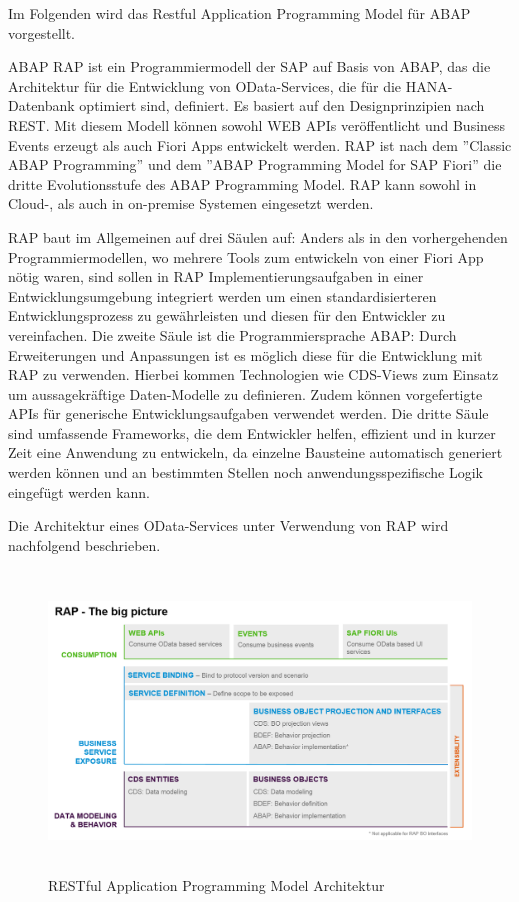 Im Folgenden wird das Restful Application Programming Model für ABAP vorgestellt.

ABAP RAP ist ein Programmiermodell der SAP auf Basis von ABAP, das die Architektur für die Entwicklung von OData-Services, die für die HANA-Datenbank optimiert sind, definiert. Es basiert auf den Designprinzipien nach REST. Mit diesem Modell können sowohl WEB APIs veröffentlicht und Business Events erzeugt als auch Fiori Apps entwickelt werden. RAP ist nach dem ''Classic ABAP Programming'' und dem ''ABAP Programming Model for SAP Fiori'' die dritte Evolutionsstufe des ABAP Programming Model.  RAP kann sowohl in Cloud-, als auch in on-premise Systemen eingesetzt werden.

RAP baut im Allgemeinen auf drei Säulen auf: Anders als in den vorhergehenden Programmiermodellen, wo mehrere Tools zum entwickeln von \zB einer Fiori App nötig waren, sind sollen in RAP Implementierungsaufgaben in einer Entwicklungsumgebung integriert werden um einen standardisierteren Entwicklungsprozess zu gewährleisten und diesen für den Entwickler zu vereinfachen. Die zweite Säule ist die Programmiersprache ABAP: Durch Erweiterungen und Anpassungen ist es möglich diese für die Entwicklung mit RAP zu verwenden. Hierbei kommen Technologien wie CDS-Views zum Einsatz um aussagekräftige Daten-Modelle zu definieren. Zudem können vorgefertigte APIs für generische Entwicklungsaufgaben verwendet werden. Die dritte Säule sind umfassende Frameworks, die dem Entwickler helfen, effizient und in kurzer Zeit eine Anwendung zu entwickeln, da einzelne Bausteine automatisch generiert werden können und an bestimmten Stellen noch anwendungsspezifische Logik eingefügt werden kann.

Die Architektur eines OData-Services unter Verwendung von RAP wird nachfolgend beschrieben.

\begin{figure}[h]
    \centering
    \includegraphics[height=8cm]{Bilder/RAP_Architektur.png}
    \caption[RESTful Application Programming Model Architektur]{RESTful Application Programming Model Architektur}
    \label{fig:iso_norm}
\end{figure}


